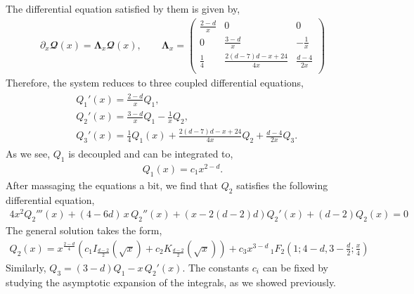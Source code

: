 The differential equation satisfied by them is given by,
\begin{align}
    \partial_{x} \mathbfcal{Q}(x)=\mathbf\Lambda_x \mathbfcal{Q}(x), \qquad \mathbf\Lambda_x =\left(
\begin{array}{ccc}
 \frac{2-d}{x} & 0 & 0 \\
 0 & \frac{3-d}{x} & -\frac{1}{x} \\
 \frac{1}{4} & \frac{2 (d-7) d-x+24}{4 x} & \frac{d-4}{2 x} \\
\end{array}
\right)
\end{align}
Therefore, the system reduces to three coupled differential equations,
\begin{align}
    \begin{split}
        &Q_1'(x)=\frac{2-d}{x}Q_1,\\ &
        Q_2'(x)=\frac{3-d}{x}Q_1-\frac{1}{x}Q_2,\\ &
        Q_3'(x)=\frac{1}{4}Q_1(x)+\frac{2 (d-7) d-x+24}{4 x}Q_2+\frac{d-4}{2x}Q_3.
    \end{split}
\end{align}
As we see, $Q_1$ is decoupled and can be integrated to,
\begin{align}
    Q_1(x)=c_1 x^{2-d}.
\end{align}
After massaging the equations a bit, we find that $Q_2$ satisfies the following differential equation,
\begin{align}
    4 x^2 Q_2'''(x)+(4-6 d)\, x\, Q_2''(x)+(x-2 (d-2) d) Q_2'(x)+(d-2) Q_2(x)=0
\end{align}
 The general solution takes the form,
 \begin{align}
     Q_2(x)=x^{\frac{2-d}{4}}\left(c_1 I_{\frac{d-2}{2}}\left(\sqrt{x}\right)+c_2 K_{\frac{d-2}{2}}(\sqrt{x})\right)+c_3 x^{3-d}\, _1F_2\left(1;4-d,3-\frac{d}{2};\frac{x}{4}\right)
 \end{align}
 Similarly, $Q_3=(3-d)Q_1-x\, Q_2'(x)$. The constants $c_i$ can be fixed by studying the asymptotic expansion of the integrals, as we showed previously.
